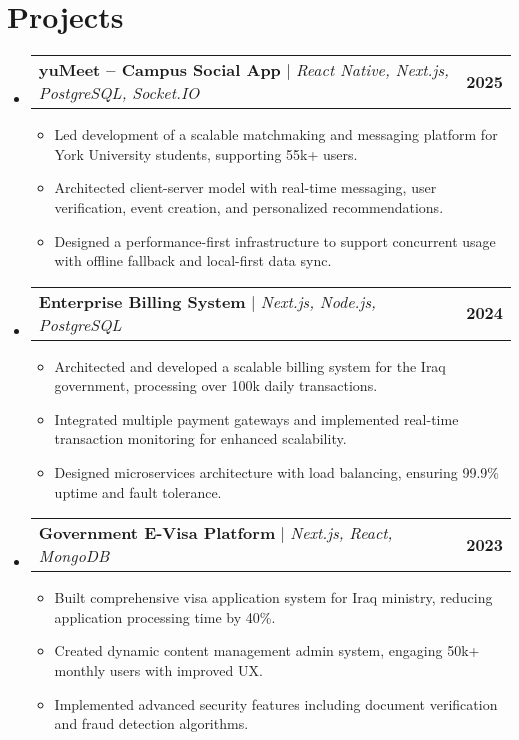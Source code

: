 \documentclass[letterpaper,11pt]{article}
\makeatletter
\newcommand{\resumeItem}[1]{
  \item\small{
    {#1 \vspace{-2pt}}
  }
}
\newcommand{\resumeProjectHeading}[2]{
    \item
    \begin{tabular*}{1.001\textwidth}{l@{\extracolsep{\fill}}r}
      \small#1 & \textbf{\small #2}\\
    \end{tabular*}\vspace{-7pt}
}
\newcommand{\resumeSubHeadingListStart}{\begin{itemize}[leftmargin=0.0in, label={}]}
\newcommand{\resumeSubHeadingListEnd}{\end{itemize}}
\newcommand{\resumeItemListStart}{\begin{itemize}}
\newcommand{\resumeItemListEnd}{\end{itemize}\vspace{-5pt}}
\makeatother
\begin{document}
\section{Projects}
    \vspace{-5pt}
    \resumeSubHeadingListStart
      \resumeProjectHeading
          {\textbf{yuMeet -- Campus Social App} $|$ \emph{React Native, Next.js, PostgreSQL, Socket.IO}}{2025}
          \resumeItemListStart
            \resumeItem{Led development of a scalable matchmaking and messaging platform for York University students, supporting 55k+ users.}
            \resumeItem{Architected client-server model with real-time messaging, user verification, event creation, and personalized recommendations.}
            \resumeItem{Designed a performance-first infrastructure to support concurrent usage with offline fallback and local-first data sync.}
          \resumeItemListEnd
          \vspace{-13pt}
      \resumeProjectHeading
          {\textbf{Enterprise Billing System} $|$ \emph{Next.js, Node.js, PostgreSQL}}{2024}
          \resumeItemListStart
            \resumeItem{Architected and developed a scalable billing system for the Iraq government, processing over 100k daily transactions.}
            \resumeItem{Integrated multiple payment gateways and implemented real-time transaction monitoring for enhanced scalability.}
            \resumeItem{Designed microservices architecture with load balancing, ensuring 99.9\% uptime and fault tolerance.}
          \resumeItemListEnd
          \vspace{-13pt}
      \resumeProjectHeading
          {\textbf{Government E-Visa Platform} $|$ \emph{Next.js, React, MongoDB}}{2023}
          \resumeItemListStart
            \resumeItem{Built comprehensive visa application system for Iraq ministry, reducing application processing time by 40\%.}
            \resumeItem{Created dynamic content management admin system, engaging 50k+ monthly users with improved UX.}
            \resumeItem{Implemented advanced security features including document verification and fraud detection algorithms.}
          \resumeItemListEnd
    \resumeSubHeadingListEnd
\vspace{-15pt}

\end{document}
